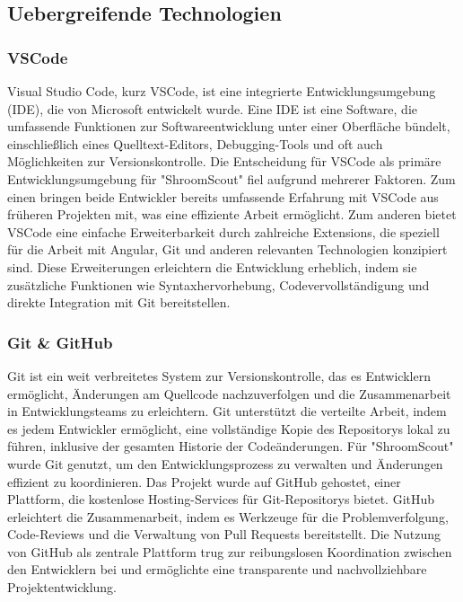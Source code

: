 \documentclass[../main.tex]{subfiles}
\begin{document}
\subsection{Uebergreifende Technologien} %
\subsubsection{VSCode}
Visual Studio Code, kurz VSCode, ist eine integrierte Entwicklungsumgebung (IDE), die von Microsoft entwickelt wurde. 
Eine IDE ist eine Software, die umfassende Funktionen zur Softwareentwicklung unter einer Oberfläche bündelt, einschließlich 
eines Quelltext-Editors, Debugging-Tools und oft auch Möglichkeiten zur Versionskontrolle. Die Entscheidung für VSCode als 
primäre Entwicklungsumgebung für "ShroomScout" fiel aufgrund mehrerer Faktoren. Zum einen bringen beide Entwickler bereits 
umfassende Erfahrung mit VSCode aus früheren Projekten mit, was eine effiziente Arbeit ermöglicht. Zum anderen bietet VSCode 
eine einfache Erweiterbarkeit durch zahlreiche Extensions, die speziell für die Arbeit mit Angular, Git und anderen relevanten 
Technologien konzipiert sind. Diese Erweiterungen erleichtern die Entwicklung erheblich, indem sie zusätzliche Funktionen wie 
Syntaxhervorhebung, Codevervollständigung und direkte Integration mit Git bereitstellen.

\subsubsection{Git & GitHub}
Git ist ein weit verbreitetes System zur Versionskontrolle, das es Entwicklern ermöglicht, Änderungen am Quellcode nachzuverfolgen 
und die Zusammenarbeit in Entwicklungsteams zu erleichtern. Git unterstützt die verteilte Arbeit, indem es jedem Entwickler ermöglicht, 
eine vollständige Kopie des Repositorys lokal zu führen, inklusive der gesamten Historie der Codeänderungen. Für "ShroomScout" wurde 
Git genutzt, um den Entwicklungsprozess zu verwalten und Änderungen effizient zu koordinieren. Das Projekt wurde auf GitHub gehostet, 
einer Plattform, die kostenlose Hosting-Services für Git-Repositorys bietet. GitHub erleichtert die Zusammenarbeit, indem es Werkzeuge 
für die Problemverfolgung, Code-Reviews und die Verwaltung von Pull Requests bereitstellt. Die Nutzung von GitHub als zentrale Plattform 
trug zur reibungslosen Koordination zwischen den Entwicklern bei und ermöglichte eine transparente und nachvollziehbare Projektentwicklung.
\end{document}
